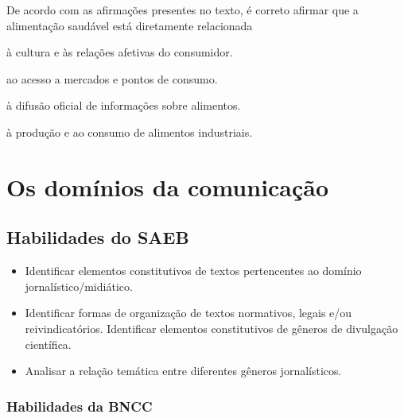 
De acordo com as afirmações presentes no texto, é correto afirmar que a alimentação saudável
está diretamente relacionada

\begin{escolha}

  \item à cultura e às relações afetivas do consumidor.
  
  \item ao acesso a mercados e pontos de consumo.
  
  \item à difusão oficial de informações sobre alimentos.
  
  \item à produção e ao consumo de alimentos industriais.

\end{escolha}

\chapter{Os domínios da comunicação}

\section{Habilidades do SAEB}

\begin{itemize}

  \item Identificar elementos constitutivos de textos pertencentes ao
domínio jornalístico/midiático.

  \item Identificar formas de organização de textos normativos, legais e/ou
reivindicatórios. Identificar elementos constitutivos de gêneros de
divulgação científica.

  \item Analisar a relação temática entre diferentes gêneros jornalísticos.

\end{itemize}

\subsection{Habilidades da BNCC}

